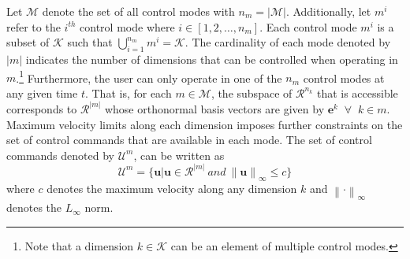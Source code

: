\documentclass[conference]{IEEEtran}
\newcommand{\norm}[1]{\left\lVert#1\right\rVert}
\begin{document}
 Let $\mathcal{M}$ denote the set of all control modes with $n_m = \vert\mathcal{M}\vert$. Additionally, let $m^i$ refer to the $i^{th}$ control mode where $i \in [1,2,\dots,n_m]$. Each control mode $m^i$ is a subset of $\mathcal{K}$ such that $\bigcup\limits_{i=1}^{n_m} m^i = \mathcal{K}$. The cardinality of each mode denoted by $\vert m \vert$ indicates the number of dimensions that can be controlled when operating in $m$.\footnote{Note that a dimension $k \in \mathcal{K}$ can be an element of multiple control modes.} Furthermore, the user can only operate in one of the $n_m$ control modes at any given time $t$. That is, for each $m \in \mathcal{M}$, the subspace of $\mathcal{R}^{n_k}$ that is accessible corresponds to $\mathcal{R}^{\vert m \vert}$ whose orthonormal basis vectors are given by $\boldsymbol{e}^k \;\; \forall \;\; k \in m$. Maximum velocity limits along each dimension imposes further constraints on the set of control commands that are available in each mode. The set of control commands denoted by $\mathcal{U}^m$, can be written as 
\begin{equation*}
\mathcal{U}^m = \{\boldsymbol{u} | \boldsymbol{u} \in \mathcal{R}^{\vert m \vert} ~ and ~ \norm{\boldsymbol{u}}_{\infty} \leq c \} 
\end{equation*}
where $c$ denotes the maximum velocity along any dimension $k$ and $\norm{\cdot}_{\infty}$ denotes the $L_\infty$ norm. 
\end{document}
